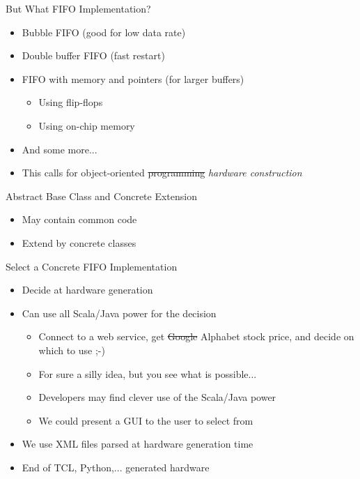 \begin{frame}[fragile]{But What FIFO Implementation?}
\begin{itemize}
\item Bubble FIFO (good for low data rate)
\item Double buffer FIFO (fast restart)
\item FIFO with memory and pointers (for larger buffers)
\begin{itemize}
\item Using flip-flops
\item Using on-chip memory
\end{itemize}
\item And some more...
\end{itemize}
\begin{itemize}
\item This calls for object-oriented \sout{programming} \emph{hardware construction}
\end{itemize}
\end{frame}

\begin{frame}[fragile]{Abstract Base Class and Concrete Extension}
\begin{itemize}
\item May contain common code
\item Extend by concrete classes
\end{itemize}
\begin{chisel}
class BubbleFifo[T <: Data](gen: T, depth: Int) extends Fifo(gen: T, depth: Int) {
\end{chisel}
\end{frame}



\begin{frame}[fragile]{Select a Concrete FIFO Implementation}
\begin{itemize}
\item Decide at hardware generation
\item Can use all Scala/Java power for the decision
\begin{itemize}
\item Connect to a web service, get \sout{Google} Alphabet stock price, and decide on which to use ;-)
\item For sure a silly idea, but you see what is possible...
\item Developers may find clever use of the Scala/Java power
\item We could present a GUI to the user to select from
\end{itemize}
\item We use XML files parsed at hardware generation time
\item End of TCL, Python,... generated hardware
\end{itemize}
\end{frame}


